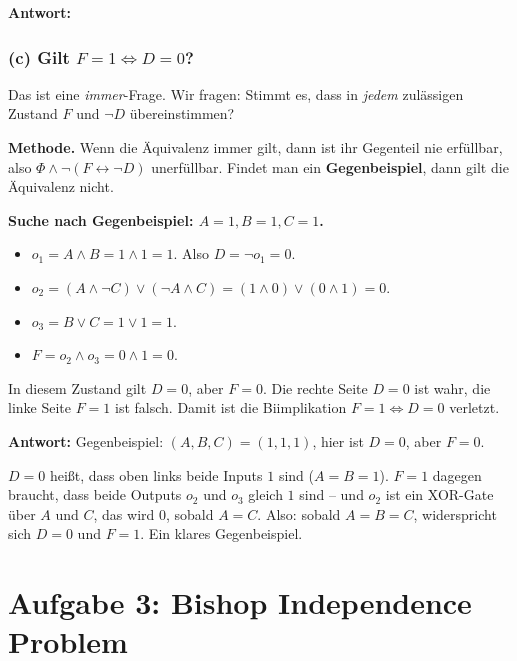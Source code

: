 \documentclass[a4paper,12pt]{article}
\begin{document}
\textbf{Antwort:} 

\subsubsection*{(c) Gilt $F = 1 \Leftrightarrow D = 0$?}

Das ist eine \emph{immer}-Frage. Wir fragen: Stimmt es, dass in
\emph{jedem} zul\"assigen Zustand $F$ und $\neg D$ \"ubereinstimmen?

\textbf{Methode.} Wenn die \"Aquivalenz immer gilt, dann ist ihr
Gegenteil nie erf\"ullbar, also $\Phi \wedge \neg(F \leftrightarrow
\neg D)$ unerf\"ullbar. Findet man ein \textbf{Gegenbeispiel}, dann
gilt die \"Aquivalenz nicht.

\textbf{Suche nach Gegenbeispiel: $A = 1, B = 1, C = 1$.}
\begin{itemize}[nosep]
\item $o_1 = A \wedge B = 1 \wedge 1 = 1$. Also $D = \neg o_1 = 0$.
\item $o_2 = (A \wedge \neg C) \vee (\neg A \wedge C) =
      (1 \wedge 0) \vee (0 \wedge 1) = 0$.
\item $o_3 = B \vee C = 1 \vee 1 = 1$.
\item $F = o_2 \wedge o_3 = 0 \wedge 1 = 0$.
\end{itemize}
In diesem Zustand gilt $D = 0$, aber $F = 0$. Die rechte Seite
$D = 0$ ist wahr, die linke Seite $F = 1$ ist falsch. Damit ist die
Biimplikation $F = 1 \Leftrightarrow D = 0$ verletzt.

\textbf{Antwort:} 
Gegenbeispiel: $(A, B, C) = (1, 1, 1)$, hier ist $D = 0$, aber
$F = 0$.

\begin{merkbox}[title={Intuition zum Gegenbeispiel}]
$D = 0$ hei{\ss}t, dass oben links beide Inputs $1$ sind ($A = B = 1$).
$F = 1$ dagegen braucht, dass beide Outputs $o_2$ und $o_3$ gleich $1$
sind -- und $o_2$ ist ein XOR-Gate \"uber $A$ und $C$, das wird $0$,
sobald $A = C$. Also: sobald $A = B = C$, widerspricht sich $D = 0$
und $F = 1$. Ein klares Gegenbeispiel.
\end{merkbox}

\newpage


\section{Aufgabe 3: Bishop Independence Problem}
\end{document}
